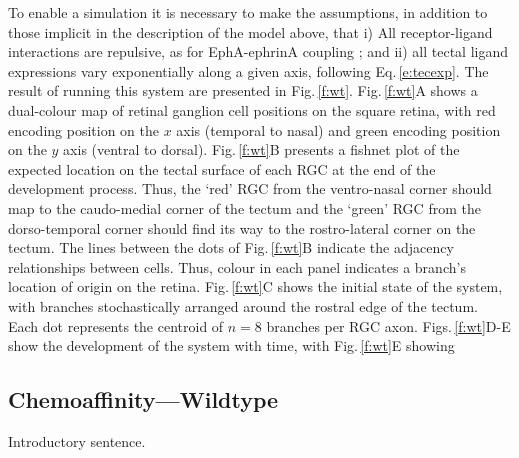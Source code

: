\documentclass[11pt, a4paper]{article}
\begin{document}
To enable a simulation it is necessary to make the assumptions, in addition to
those implicit in the description of the model above, that i) All
receptor-ligand interactions are repulsive, as for EphA-ephrinA
coupling \citep{drescher_vitro_1995,nakamoto_topographically_1996}; and ii)
all tectal ligand expressions vary exponentially along a given axis, following
Eq.\,\ref{e:tecexp}. The result of running this system are presented in
Fig.\,\ref{f:wt}.
%
Fig.\,\ref{f:wt}A shows a dual-colour map of retinal ganglion cell positions
on the square retina, with red encoding position on the $x$ axis (temporal to
nasal) and green encoding position on the $y$ axis (ventral to
dorsal). Fig.\,\ref{f:wt}B presents a fishnet plot of the expected location on
the tectal surface of each RGC at the end of the development process. Thus,
the `red' RGC from the ventro-nasal corner should map to the caudo-medial
corner of the tectum and the `green' RGC from the dorso-temporal corner should
find its way to the rostro-lateral corner on the tectum. The lines between the
dots of Fig.\,\ref{f:wt}B indicate the adjacency relationships between
cells. Thus, colour in each panel indicates a branch's location of origin on
the retina.
%
Fig.\,\ref{f:wt}C shows the initial state of the system, with branches
stochastically arranged around the rostral edge of the tectum. Each dot
represents the centroid of $n=8$ branches per RGC axon. Figs.\,\ref{f:wt}D-E
show the development of the system with time, with Fig.\,\ref{f:wt}E showing

\subsection*{Chemoaffinity---Wildtype}

Introductory sentence.
\end{document}
